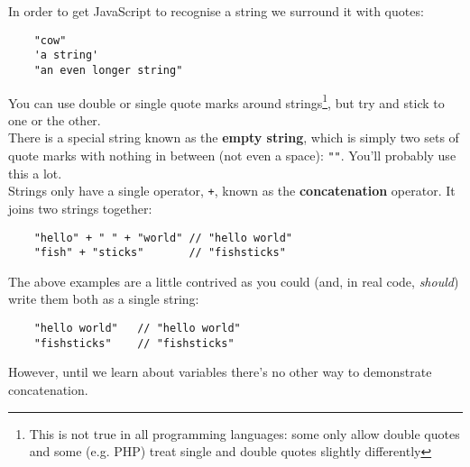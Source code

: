 In order to get JavaScript to recognise a string we surround it with quotes:

\begin{verbatim}
    "cow"
    'a string'
    "an even longer string"
\end{verbatim}

You can use double or single quote marks around strings\footnote{This is not true in all programming languages: some only allow double quotes and some (e.g. PHP) treat single and double quotes slightly differently}, but try and stick to one or the other.
\\

There is a special string known as the \textbf{empty string}, which is simply two sets of quote marks with nothing in between (not even a space): \texttt{""}. You'll probably use this a lot.
\\

Strings only have a single operator, \texttt{+}, known as the \textbf{concatenation} operator. It joins two strings together:

\begin{verbatim}
    "hello" + " " + "world" // "hello world"
    "fish" + "sticks"       // "fishsticks"
\end{verbatim}

The above examples are a little contrived as you could (and, in real code, \textit{should}) write them both as a single string:

\begin{verbatim}
    "hello world"   // "hello world"
    "fishsticks"    // "fishsticks"
\end{verbatim}

However, until we learn about variables there's no other way to demonstrate concatenation.


